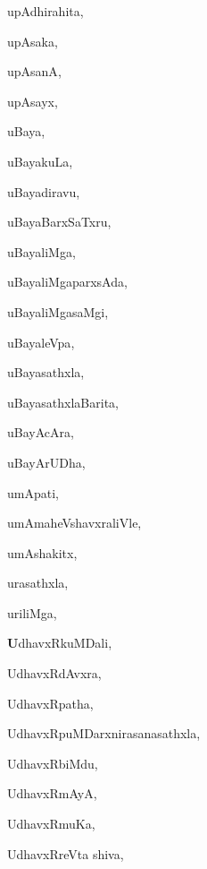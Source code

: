 \begin{multicols}{3}
{\noindent
{upAdhirahita}, \pageref{upAdhirahita}

\noindent
{upAsaka}, \pageref{upAsaka}

\noindent
{upAsanA}, \pageref{upAsanA}

\noindent
{upAsayx}, \pageref{upAsayx}

\noindent
{uBaya}, \pageref{uBaya}

\noindent
{uBayakuLa}, \pageref{uBayakuLa}

\noindent
{uBayadiravu}, \pageref{uBayadiravu}

\noindent
{uBayaBarxSaTxru}, \pageref{uBayaBarxSaTxru}

\noindent
{uBayaliMga}, \pageref{uBayaliMga}

\noindent
{uBayaliMgaparxsAda}, \pageref{uBayaliMgaparxsAda}

\noindent
{uBayaliMgasaMgi}, \pageref{uBayaliMgasaMgi}

\noindent
{uBayaleVpa}, \pageref{uBayaleVpa}

\noindent
{uBayasathxla}, \pageref{uBayasathxla}

\noindent
{uBayasathxlaBarita}, \pageref{uBayasathxlaBarita}

\noindent
{uBayAcAra}, \pageref{uBayAcAra}

\noindent
{uBayArUDha}, \pageref{uBayArUDha}

\noindent
{umApati}, \pageref{umApati}

\noindent
{umAmaheVshavxraliVle}, \pageref{umAmaheVshavxraliVle}

\noindent
{umAshakitx}, \pageref{umAshakitx}

\noindent
{urasathxla}, \pageref{urasathxla}

\noindent
{uriliMga}, \pageref{uriliMga}

\noindent
{{\large\textbf{U}}dhavxRkuMDali}, \pageref{UdhavxRkuMDali}

\noindent
{UdhavxRdAvxra}, \pageref{UdhavxRdAvxra}

\noindent
{UdhavxRpatha}, \pageref{UdhavxRpatha}

\noindent
{UdhavxRpuMDarxnirasanasathxla}, \pageref{UdhavxRpuMDarxnirasanasathxla}

\noindent
{UdhavxRbiMdu}, \pageref{UdhavxRbiMdu}

\noindent
{UdhavxRmAyA}, \pageref{UdhavxRmAyA}

\noindent
{UdhavxRmuKa}, \pageref{UdhavxRmuKa}

\noindent
{UdhavxRreVta shiva}, \pageref{UdhavxRreVta shiva}

}
\end{multicols}
